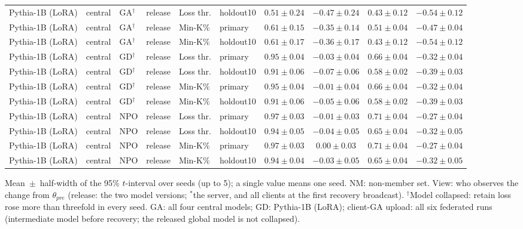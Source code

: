 \begin{table}[t]
\begin{tabular*}{\textwidth}{@{\extracolsep{\fill}}llllllcccc@{}}
Pythia-1B (LoRA) & central & GA$^{\dagger}$ & release & Loss thr. & holdout10 & $0.51 \pm 0.24$ & $-0.47 \pm 0.24$ & $0.43 \pm 0.12$ & $-0.54 \pm 0.12$ \\
Pythia-1B (LoRA) & central & GA$^{\dagger}$ & release & Min-K\% & primary & $0.61 \pm 0.15$ & $-0.35 \pm 0.14$ & $0.51 \pm 0.04$ & $-0.47 \pm 0.04$ \\
Pythia-1B (LoRA) & central & GA$^{\dagger}$ & release & Min-K\% & holdout10 & $0.61 \pm 0.17$ & $-0.36 \pm 0.17$ & $0.43 \pm 0.12$ & $-0.54 \pm 0.12$ \\
Pythia-1B (LoRA) & central & GD$^{\dagger}$ & release & Loss thr. & primary & $0.95 \pm 0.04$ & $-0.03 \pm 0.04$ & $0.66 \pm 0.04$ & $-0.32 \pm 0.04$ \\
Pythia-1B (LoRA) & central & GD$^{\dagger}$ & release & Loss thr. & holdout10 & $0.91 \pm 0.06$ & $-0.07 \pm 0.06$ & $0.58 \pm 0.02$ & $-0.39 \pm 0.03$ \\
Pythia-1B (LoRA) & central & GD$^{\dagger}$ & release & Min-K\% & primary & $0.95 \pm 0.04$ & $-0.01 \pm 0.04$ & $0.66 \pm 0.04$ & $-0.32 \pm 0.04$ \\
Pythia-1B (LoRA) & central & GD$^{\dagger}$ & release & Min-K\% & holdout10 & $0.91 \pm 0.06$ & $-0.05 \pm 0.06$ & $0.58 \pm 0.02$ & $-0.39 \pm 0.03$ \\
Pythia-1B (LoRA) & central & NPO & release & Loss thr. & primary & $0.97 \pm 0.03$ & $-0.01 \pm 0.03$ & $0.71 \pm 0.04$ & $-0.27 \pm 0.04$ \\
Pythia-1B (LoRA) & central & NPO & release & Loss thr. & holdout10 & $0.94 \pm 0.05$ & $-0.04 \pm 0.05$ & $0.65 \pm 0.04$ & $-0.32 \pm 0.05$ \\
Pythia-1B (LoRA) & central & NPO & release & Min-K\% & primary & $0.97 \pm 0.03$ & $0.00 \pm 0.03$ & $0.71 \pm 0.04$ & $-0.27 \pm 0.04$ \\
Pythia-1B (LoRA) & central & NPO & release & Min-K\% & holdout10 & $0.94 \pm 0.04$ & $-0.03 \pm 0.05$ & $0.65 \pm 0.04$ & $-0.32 \pm 0.05$ \\
\bottomrule
\end{tabular*}

\smallskip
{\footnotesize Mean~$\pm$~half-width of the 95\% $t$-interval over seeds (up to 5); a single value means one seed. NM: non-member set. View: who observes the change from $\theta_{pre}$ (release: the two model versions; $^{*}$the server, and all clients at the first recovery broadcast). $^{\dagger}$Model collapsed: retain loss rose more than threefold in every seed. GA: all four central models; GD: Pythia-1B (LoRA); client-GA upload: all six federated runs (intermediate model before recovery; the released global model is not collapsed).\par}
\end{table}
